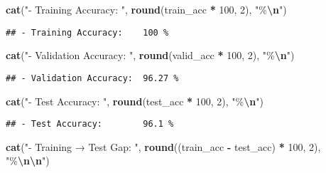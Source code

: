 \documentclass[
]{article}
\newenvironment{Shaded}{\begin{snugshade}}{\end{snugshade}}
\newcommand{\DecValTok}[1]{\textcolor[rgb]{0.00,0.00,0.81}{#1}}
\newcommand{\FunctionTok}[1]{\textcolor[rgb]{0.13,0.29,0.53}{\textbf{#1}}}
\newcommand{\NormalTok}[1]{#1}
\newcommand{\SpecialCharTok}[1]{\textcolor[rgb]{0.81,0.36,0.00}{\textbf{#1}}}
\newcommand{\StringTok}[1]{\textcolor[rgb]{0.31,0.60,0.02}{#1}}
\begin{document}
\begin{Shaded}
\begin{Highlighting}[]
\FunctionTok{cat}\NormalTok{(}\StringTok{"{-} Training Accuracy:   "}\NormalTok{, }\FunctionTok{round}\NormalTok{(train\_acc }\SpecialCharTok{*} \DecValTok{100}\NormalTok{, }\DecValTok{2}\NormalTok{), }\StringTok{"\%}\SpecialCharTok{\textbackslash{}n}\StringTok{"}\NormalTok{)}
\end{Highlighting}
\end{Shaded}

\begin{verbatim}
## - Training Accuracy:    100 %
\end{verbatim}

\begin{Shaded}
\begin{Highlighting}[]
\FunctionTok{cat}\NormalTok{(}\StringTok{"{-} Validation Accuracy: "}\NormalTok{, }\FunctionTok{round}\NormalTok{(valid\_acc }\SpecialCharTok{*} \DecValTok{100}\NormalTok{, }\DecValTok{2}\NormalTok{), }\StringTok{"\%}\SpecialCharTok{\textbackslash{}n}\StringTok{"}\NormalTok{)}
\end{Highlighting}
\end{Shaded}

\begin{verbatim}
## - Validation Accuracy:  96.27 %
\end{verbatim}

\begin{Shaded}
\begin{Highlighting}[]
\FunctionTok{cat}\NormalTok{(}\StringTok{"{-} Test Accuracy:       "}\NormalTok{, }\FunctionTok{round}\NormalTok{(test\_acc }\SpecialCharTok{*} \DecValTok{100}\NormalTok{, }\DecValTok{2}\NormalTok{), }\StringTok{"\%}\SpecialCharTok{\textbackslash{}n}\StringTok{"}\NormalTok{)}
\end{Highlighting}
\end{Shaded}

\begin{verbatim}
## - Test Accuracy:        96.1 %
\end{verbatim}

\begin{Shaded}
\begin{Highlighting}[]
\FunctionTok{cat}\NormalTok{(}\StringTok{"{-} Training → Test Gap: "}\NormalTok{, }\FunctionTok{round}\NormalTok{((train\_acc }\SpecialCharTok{{-}}\NormalTok{ test\_acc) }\SpecialCharTok{*} \DecValTok{100}\NormalTok{, }\DecValTok{2}\NormalTok{), }\StringTok{"\%}\SpecialCharTok{\textbackslash{}n\textbackslash{}n}\StringTok{"}\NormalTok{)}
\end{Highlighting}
\end{Shaded}
\end{document}
